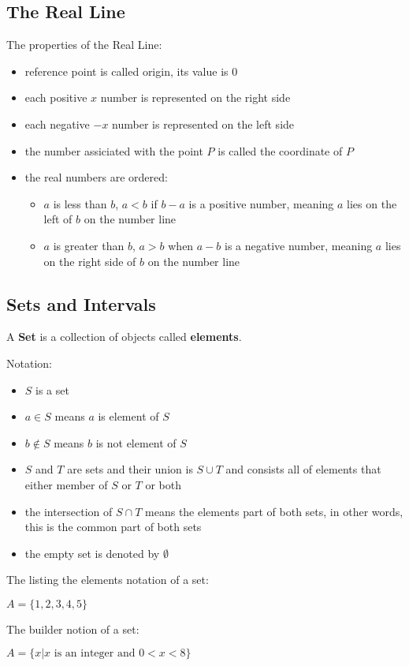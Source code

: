 \subsection{The Real Line}

The properties of the Real Line:

\begin{itemize}
    \item reference point is called origin, its value is $0$
    \item each positive $x$ number is represented on the right side
    \item each negative $-x$ number is represented on the left side
    \item the number assiciated with the point $P$ is called the coordinate of
        $P$
    \item the real numbers are ordered:
    \begin{itemize}
        \item $a$ is less than $b$,  $a < b$ if $b - a$ is a positive number,
            meaning $a$ lies on the left of $b$ on the number line
        \item $a$ is greater than $b$, $a > b$ when $a - b$ is a negative
            number, meaning $a$ lies on the right side of $b$ on the number line
    \end{itemize}
\end{itemize}

\subsection{Sets and Intervals}

A \textbf{Set} is a collection of objects called \textbf{elements}.

Notation:
\begin{itemize}
    \item $S$ is a set
    \item $a \in S$ means $a$ is element of $S$
    \item $b \notin S$ means $b$ is not element of $S$
    \item $S$ and $T$ are sets and their union is $S \cup T$ and consists all of
        elements that either member of $S$ or $T$ or both
    \item the intersection of $S \cap T$ means the elements part of both sets, in
        other words, this is the common part of both sets
    \item the empty set is denoted by $\emptyset$
\end{itemize}

The listing the elements notation of a set:

\begin{center}
$A = \{1, 2, 3, 4, 5\}$
\end{center}

The builder notion of a set: 

\begin{center}
$ A = \{x | x \text{ is an integer and } 0 < x < 8 \}$
\end{center}
